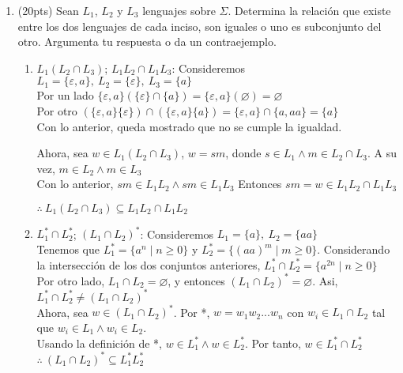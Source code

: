\documentclass{article}
\begin{document}
\begin{enumerate}
    \item (20pts) Sean $L_1$, $L_2$ y $L_3$ lenguajes sobre $\Sigma$. Determina la relación que existe entre los dos lenguajes de cada inciso, son iguales o uno es subconjunto del otro. Argumenta tu respuesta o da un contraejemplo.
    \begin{enumerate}
        \item $L_1(L_2 \cap L_3)$; $L_1L_2 \cap L_1L_3$: Consideremos $L_1 = \{\varepsilon, a\},~L_2 = \{\varepsilon\},~ L_3 = \{a\}$  \\
            Por un lado $\{\varepsilon, a\} (\{\varepsilon\}\cap \{a\}) = \{\varepsilon, a\}(\varnothing) = \varnothing$ \\
            Por otro $(\{\varepsilon, a\}\{\varepsilon\})\cap(\{\varepsilon, a\}\{a\}) = \{\varepsilon, a\} \cap \{a, aa\} = \{a\}$ \\
            Con lo anterior, queda mostrado que no se cumple la igualdad.
            
            Ahora, sea $w \in L_1(L_2 \cap L_3)$, $w = sm$, donde $s \in L_1 \land m \in L_2 \cap L_3$. A su vez, $m \in L_2 \land m \in L_3$ \\
            Con lo anterior, $sm \in L_1L_2 \land sm \in L_1L_3$
            Entonces $sm = w \in L_1L_2 \cap L_1L_3$

            $ \therefore ~L_1(L_2 \cap L_3) \subseteq L_1L_2 \cap L_1L_2$
        \item $L_1^* \cap L_2^*$; $(L_1 \cap L_2)^*$: Consideremos $L_1 = \{a\},~ L_2 = \{aa\}$\\
        Tenemos que $L_1^* = \{a^n \mid n \ge 0\}$ y $L_2^* = \{(aa)^m \mid m \ge 0\}$. Considerando la intersección de los dos conjuntos anteriores, $L_1^* \cap L_2^* = \{a^{2n} \mid n \ge 0\}$ \\
        Por otro lado, $L_1 \cap L_2 = \varnothing$, y entonces $(L_1 \cap L_2)^* = \varnothing$. Asi, $L_1^* \cap L_2^* \neq (L_1 \cap L_2)^*$\\
        
        Ahora, sea $w \in (L_1 \cap L_2)^*$. Por *, $w = w_1w_2...w_n$ con $w_i \in L_1 \cap L_2$ tal que $w_i \in L_1 \land w_i \in L_2$. \\
        Usando la definición de *, $w \in L_1^* \land w \in L_2^*$. Por tanto, $w \in L_1^* \cap L_2^*$ \\

        $\therefore ~ (L_1 \cap L_2)^* \subseteq L_1^*L_2^*$
        

\end{enumerate}
\end{enumerate}
\end{document}

